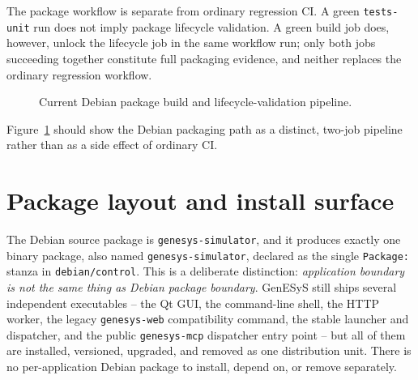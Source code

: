 The package workflow is separate from ordinary regression CI. A green
\texttt{tests-unit} run does not imply package lifecycle validation. A green
build job does, however, unlock the lifecycle job in the same workflow run;
only both jobs succeeding together constitute full packaging evidence, and
neither replaces the ordinary regression workflow.

\begin{figure}[htbp]
\centering
\caption{Current Debian package build and lifecycle-validation pipeline.}
\label{fig:packaging-debian-pipeline}
\end{figure}

Figure~\ref{fig:packaging-debian-pipeline} should show the Debian packaging path
as a distinct, two-job pipeline rather than as a side effect of ordinary CI.

\section{Package layout and install surface}
\label{sec:packaging-package-layout}

The Debian source package is \texttt{genesys-simulator}, and it produces
exactly one binary package, also named \texttt{genesys-simulator}, declared as
the single \texttt{Package:} stanza in \texttt{debian/control}. This is a
deliberate distinction: \emph{application boundary is not the same thing as
Debian package boundary}. GenESyS still ships several independent
executables -- the Qt GUI, the command-line shell, the HTTP worker, the
legacy \texttt{genesys-web} compatibility command, the stable launcher and
dispatcher, and the public \texttt{genesys-mcp} dispatcher entry point -- but
all of them are installed, versioned, upgraded, and removed as one
distribution unit. There is no per-application Debian package to install,
depend on, or remove separately.

